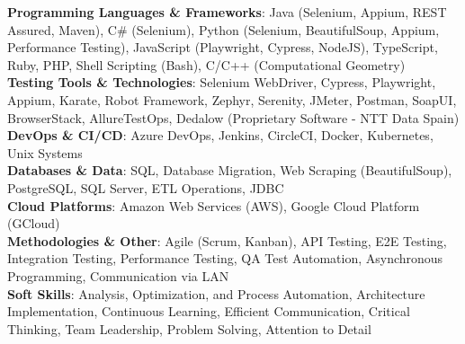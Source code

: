 \small{\item{ %
    \textbf{Programming Languages \& Frameworks}{: Java (Selenium, Appium, REST Assured, Maven), C\# (Selenium), Python (Selenium, BeautifulSoup, Appium, Performance Testing), JavaScript (Playwright, Cypress, NodeJS), TypeScript, Ruby, PHP, Shell Scripting (Bash), C/C++ (Computational Geometry)} \\
    \textbf{Testing Tools \& Technologies}{: Selenium WebDriver, Cypress, Playwright, Appium, Karate, Robot Framework, Zephyr, Serenity, JMeter, Postman, SoapUI, BrowserStack, AllureTestOps, Dedalow (Proprietary Software - NTT Data Spain)} \\
    \textbf{DevOps \& CI/CD}{: Azure DevOps, Jenkins, CircleCI, Docker, Kubernetes, Unix Systems} \\
    \textbf{Databases \& Data}{: SQL, Database Migration, Web Scraping (BeautifulSoup), PostgreSQL, SQL Server, ETL Operations, JDBC} \\
    \textbf{Cloud Platforms}{: Amazon Web Services (AWS), Google Cloud Platform (GCloud)} \\
    \textbf{Methodologies \& Other}{: Agile (Scrum, Kanban), API Testing, E2E Testing, Integration Testing, Performance Testing, QA Test Automation, Asynchronous Programming, Communication via LAN} \\
    \textbf{Soft Skills}{: Analysis, Optimization, and Process Automation, Architecture Implementation, Continuous Learning, Efficient Communication, Critical Thinking, Team Leadership, Problem Solving, Attention to Detail}
}}
